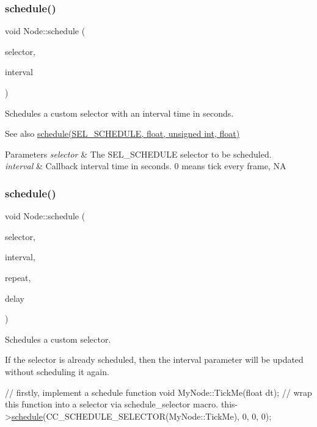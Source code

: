 \subsubsection{\texorpdfstring{schedule()}{schedule()}\hspace{0.1cm}{\footnotesize\ttfamily [2/12]}}
{\footnotesize\ttfamily void Node\+::schedule (\begin{DoxyParamCaption}\item[{S\+E\+L\+\_\+\+S\+C\+H\+E\+D\+U\+LE}]{selector,  }\item[{float}]{interval }\end{DoxyParamCaption})}

Schedules a custom selector with an interval time in seconds. \begin{DoxySeeAlso}{See also}
{\ttfamily \hyperlink{classNode_a5957efe46bfe7f83f9adb5b737f7ce11}{schedule(\+S\+E\+L\+\_\+\+S\+C\+H\+E\+D\+U\+L\+E, float, unsigned int, float)}}
\end{DoxySeeAlso}

\begin{DoxyParams}{Parameters}
{\em selector} & The S\+E\+L\+\_\+\+S\+C\+H\+E\+D\+U\+LE selector to be scheduled. \\
\hline
{\em interval} & Callback interval time in seconds. 0 means tick every frame,  NA \\
\hline
\end{DoxyParams}
\mbox{\label{classNode_a5957efe46bfe7f83f9adb5b737f7ce11}} 
\subsubsection{\texorpdfstring{schedule()}{schedule()}\hspace{0.1cm}{\footnotesize\ttfamily [3/12]}}
{\footnotesize\ttfamily void Node\+::schedule (\begin{DoxyParamCaption}\item[{S\+E\+L\+\_\+\+S\+C\+H\+E\+D\+U\+LE}]{selector,  }\item[{float}]{interval,  }\item[{unsigned int}]{repeat,  }\item[{float}]{delay }\end{DoxyParamCaption})}

Schedules a custom selector.

If the selector is already scheduled, then the interval parameter will be updated without scheduling it again. 
\begin{DoxyCode}
\textcolor{comment}{// firstly, implement a schedule function}
\textcolor{keywordtype}{void} MyNode::TickMe(\textcolor{keywordtype}{float} dt);
\textcolor{comment}{// wrap this function into a selector via schedule\_selector macro.}
this->\hyperlink{classNode_a5957efe46bfe7f83f9adb5b737f7ce11}{schedule}(CC\_SCHEDULE\_SELECTOR(MyNode::TickMe), 0, 0, 0);
\end{DoxyCode}



